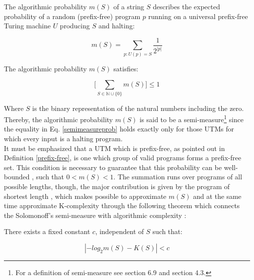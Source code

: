 \begin{defn}
The algorithmic probability $m(S)$ of a string $S$ describes the expected probability of a random (prefix-free) program $p$ running on a universal prefix-free Turing machine $U$ producing $S$ and halting:

\begin{equation}
\label{algo_prob}
  m(S)=\sum_{p:U(p)=S} \frac{1}{2^{|p|}}
\end{equation}

\end{defn}

The algorithmic probability $m(S)$ satisfies:

\begin{equation}
\label{semimeasureprob}
  \bigg[ \sum_{S \in \mathbb{N} \cup \{0\}} m(S) \bigg] \leq 1
\end{equation}

Where $S$ is the binary representation of the natural numbers including the zero. Thereby, the algorithmic probability $m(S)$ is said to be a semi-measure\footnote{For a definition of semi-measure see \cite{kolmo_book2} section 6.9 and \cite{kolmo_book} section 4.3.} since the equality in Eq. \ref{semimeasureprob} holds exactly only for those UTMs for which every input is a halting program.\\

It must be emphasized that a UTM which is prefix-free, as pointed out in Definition \ref{prefix-free}, is one which group of valid programs forms a prefix-free set. This condition is necessary to guarantee that this probability can be well-bounded \cite{kolmo_calculating}, such that $0<m(S)<1$. The summation runs over programs of all possible lengths, though, the major contribution is given by the program of shortest length \cite{decomposition}, which makes possible to approximate $m(S)$ and at the same time approximate K-complexity through the following theorem which connects the Solomonoff's semi-measure with algorithmic complexity \cite{kolmo_calculating}:

\begin{theorem}
There exists a fixed constant $c$, independent of $S$ such that:

\begin{equation}
\label{coding_theorem}
  |-log_{2}m(S)-K(S)|<c
\end{equation}

\end{theorem}

